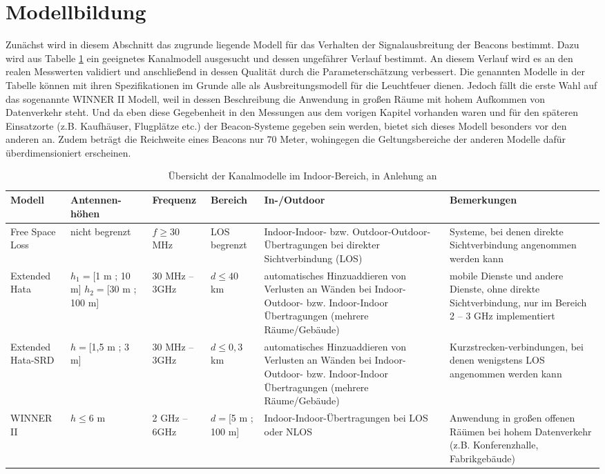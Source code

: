 \section{Modellbildung}
Zunächst wird in diesem Abschnitt das zugrunde liegende Modell für das Verhalten der Signalausbreitung der Beacons bestimmt. Dazu wird aus Tabelle \ref{tab:Uebersicht} ein geeignetes Kanalmodell ausgesucht und dessen ungefährer Verlauf bestimmt. An diesem Verlauf wird es an den realen Messwerten validiert und anschließend in dessen Qualität durch die Parameterschätzung verbessert. Die genannten Modelle in der Tabelle können mit ihren Spezifikationen im Grunde alle als Ausbreitungsmodell für die Leuchtfeuer dienen. Jedoch fällt die erste Wahl auf das sogenannte WINNER II Modell, weil in dessen Beschreibung die Anwendung in großen Räume mit hohem Aufkommen von Datenverkehr steht. Und da eben diese Gegebenheit in den Messungen aus dem vorigen Kapitel vorhanden waren und für den späteren Einsatzorte (z.B. Kaufhäuser, Flugplätze etc.) der Beacon-Systeme gegeben sein werden, bietet sich dieses Modell besonders vor den anderen an. Zudem beträgt die Reichweite eines Beacons nur 70 Meter, wohingegen die Geltungsbereiche der anderen Modelle dafür überdimensioniert erscheinen.
\begin{table}[H]
\begin{tabular}{|m{1.6cm}|m{1.9cm}|m{1.7cm}|m{1.6cm}|m{3.1cm}|m{3.1cm}|}
\hline 
Modell & Antennen-höhen & Frequenz & Bereich & In-/Outdoor & Bemerkungen \\ \hline 
Free Space Loss & nicht begrenzt & $f\geq$30 MHz & LOS begrenzt & Indoor-Indoor- bzw. Outdoor-Outdoor-Übertragungen bei direkter Sichtverbindung (LOS) & Systeme, bei denen direkte Sichtverbindung angenommen werden kann \\ \hline 
Extended Hata & $h_1=$[1 m ; 10 m] $h_2=$[30 m ; 100 m] & 30 MHz -- 3GHz & $d\leq40$ km & automatisches Hinzuaddieren von Verlusten an Wänden bei Indoor-Outdoor- bzw. Indoor-Indoor Übertragungen (mehrere Räume/Gebäude) & mobile Dienste und andere Dienste, ohne direkte Sichtverbindung, nur im Bereich 2 -- 3 GHz implementiert \\ \hline 
Extended Hata-SRD & $h=$[1,5 m ; 3 m] & 30 MHz -- 3GHz & $d\leq0,3$ km & automatisches Hinzuaddieren von Verlusten an Wänden bei Indoor-Outdoor- bzw. Indoor-Indoor Übertragungen (mehrere Räume/Gebäude) & Kurzstrecken-verbindungen, bei denen wenigstens LOS angenommen werden kann \\ \hline 
WINNER II & $h\leq6$ m & 2 GHz -- 6GHz & $d=$[5 m ; 100 m] & Indoor-Indoor-Übertragungen bei LOS oder NLOS & Anwendung in großen offenen Räümen bei hohem Datenverkehr (z.B. Konferenzhalle, Fabrikgebäude) \\ \hline 
\end{tabular} 
\caption{Übersicht der Kanalmodelle im Indoor-Bereich, in Anlehung an \cite{Kanal}}
\label{tab:Uebersicht}
\end{table}
